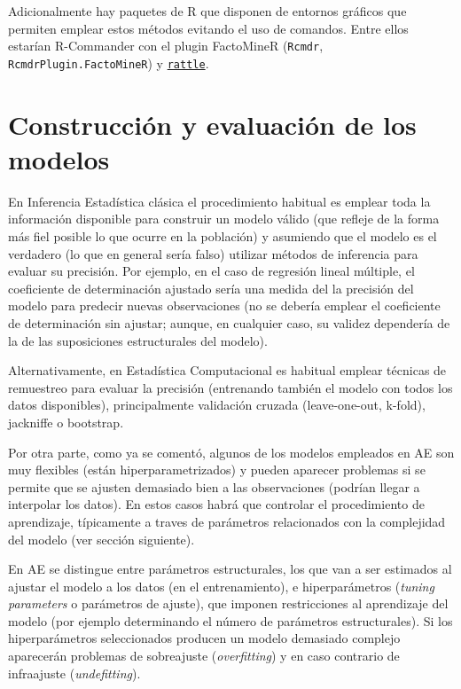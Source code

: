 \documentclass[
]{book}
\theoremstyle{break}
\theoremstyle{definition}
\theoremstyle{definition}
\theoremstyle{definition}
\theoremstyle{definition}
\theoremstyle{remark}
\begin{document}
Adicionalmente hay paquetes de R que disponen de entornos gráficos que permiten emplear estos métodos evitando el uso de comandos.
Entre ellos estarían R-Commander con el plugin FactoMineR (\texttt{Rcmdr}, \texttt{RcmdrPlugin.FactoMineR}) y \href{https://rattle.togaware.com}{\texttt{rattle}}.

\hypertarget{const-eval}{%
\section{Construcción y evaluación de los modelos}\label{const-eval}}

En Inferencia Estadística clásica el procedimiento habitual es emplear toda la información disponible para construir un modelo válido (que refleje de la forma más fiel posible lo que ocurre en la población) y asumiendo que el modelo es el verdadero (lo que en general sería falso) utilizar métodos de inferencia para evaluar su precisión.
Por ejemplo, en el caso de regresión lineal múltiple, el coeficiente de determinación ajustado sería una medida del la precisión del modelo para predecir nuevas observaciones (no se debería emplear el coeficiente de determinación sin ajustar; aunque, en cualquier caso, su validez dependería de la de las suposiciones estructurales del modelo).

Alternativamente, en Estadística Computacional es habitual emplear técnicas de remuestreo para evaluar la precisión (entrenando también el modelo con todos los datos disponibles), principalmente validación cruzada (leave-one-out, k-fold), jackniffe o bootstrap.

Por otra parte, como ya se comentó, algunos de los modelos empleados en AE son muy flexibles (están hiperparametrizados) y pueden aparecer problemas si se permite que se ajusten demasiado bien a las observaciones (podrían llegar a interpolar los datos).
En estos casos habrá que controlar el procedimiento de aprendizaje, típicamente a traves de parámetros relacionados con la complejidad del modelo (ver sección siguiente).

En AE se distingue entre parámetros estructurales, los que van a ser estimados al ajustar el modelo a los datos (en el entrenamiento), e hiperparámetros (\emph{tuning parameters} o parámetros de ajuste), que imponen restricciones al aprendizaje del modelo (por ejemplo determinando el número de parámetros estructurales).
Si los hiperparámetros seleccionados producen un modelo demasiado complejo aparecerán problemas de sobreajuste (\emph{overfitting}) y en caso contrario de infraajuste (\emph{undefitting}).
\end{document}
